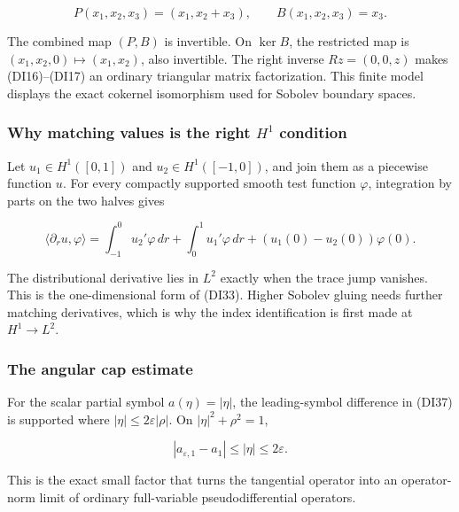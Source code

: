 \documentclass[
  11pt,
]{article}
\makeatletter
\let\ReaderOriginalAnchorStart\hyper@anchorstart
\let\ReaderOriginalAnchorEnd\hyper@anchorend
\let\ReaderPendingAliases\@empty
\def\ReaderArmAliases#1{\gdef\ReaderPendingAliases{#1}}
\def\hyper@anchorstart#1{\ReaderIfNativeAnchorTF{#1}{\ReaderPendingAliases\global\let\ReaderPendingAliases\@empty}{}\ReaderOriginalAnchorStart{#1}}
\makeatother
\begin{document}
\[
 P(x_1,x_2,x_3)=(x_1,x_2+x_3),\qquad B(x_1,x_2,x_3)=x_3.
 \tag{DI47}
\]

The combined map \((P,B)\) is invertible. On \(\ker B\), the restricted
map is \((x_1,x_2,0)\mapsto(x_1,x_2)\), also invertible. The right
inverse \(Rz=(0,0,z)\) makes (DI16)--(DI17) an ordinary triangular
matrix factorization. This finite model displays the exact cokernel
isomorphism used for Sobolev boundary spaces.

\ReaderArmAliases{\ReaderOriginalAnchorStart{why-matching-values-is-the-right-h1-condition}\ReaderOriginalAnchorEnd}
\subsubsection{\texorpdfstring{Why matching values is the right \(H^1\)
condition}{Why matching values is the right H\^{}1 condition}}\label{why-matching-values-is-the-right-h1-condition}

Let \(u_1\in H^1([0,1])\) and \(u_2\in H^1([-1,0])\), and join them as a
piecewise function \(u\). For every compactly supported smooth test
function \(\varphi\), integration by parts on the two halves gives

\[
 \langle \partial_ru,\varphi\rangle
 =\int_{-1}^0u_2'\varphi\,dr+\int_0^1u_1'\varphi\,dr
  +(u_1(0)-u_2(0))\varphi(0).
 \tag{DI48}
\]

The distributional derivative lies in \(L^2\) exactly when the trace
jump vanishes. This is the one-dimensional form of (DI33). Higher
Sobolev gluing needs further matching derivatives, which is why the
index identification is first made at \(H^1\to L^2\).

\ReaderArmAliases{\ReaderOriginalAnchorStart{the-angular-cap-estimate}\ReaderOriginalAnchorEnd}
\subsubsection{The angular cap estimate}\label{the-angular-cap-estimate}

For the scalar partial symbol \(a(\eta)=|\eta|\), the leading-symbol
difference in (DI37) is supported where
\(|\eta|\leq2\varepsilon|\rho|\). On \(|\eta|^2+\rho^2=1\),

\[
 |a_{\varepsilon,1}-a_1|\leq|\eta|\leq2\varepsilon.
 \tag{DI49}
\]

This is the exact small factor that turns the tangential operator into
an operator-norm limit of ordinary full-variable pseudodifferential
operators.

\ReaderArmAliases{\ReaderOriginalAnchorStart{AN03-SDI-012}\ReaderOriginalAnchorEnd\begingroup\expandafter\def\csname @currentHref\endcsname{AN03-SDI-012}\label{AN03-SDI-012}\endgroup\ReaderOriginalAnchorStart{12-exercises-with-complete-solutions}\ReaderOriginalAnchorEnd\begingroup\expandafter\def\csname @currentHref\endcsname{12-exercises-with-complete-solutions}\label{12-exercises-with-complete-solutions}\endgroup\ReaderOriginalAnchorStart{exercises-with-complete-solutions}\ReaderOriginalAnchorEnd}
\end{document}
